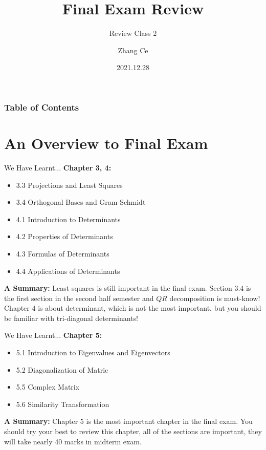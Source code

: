\documentclass{beamer}
\title[Linear Algebra] %
{Final Exam Review}
\subtitle{Review Class 2}
\author[11910803@mail.sustech.edu.cn] %
{
    Zhang Ce
}
\institute[] %
{
    Department of Electrical and Electronic Engineering\\
    Southern University of Science and Technology
}
\date[2021.12.28] %
{2021.12.28}
\begin{document}
\frame{\titlepage}


\begin{frame}
\frametitle{Table of Contents}
\tableofcontents
\end{frame}
\section{An Overview to Final Exam}
\begin{frame}{We Have Learnt...}
\textbf{Chapter 3, 4:}
\begin{itemize}
    \item 3.3 Projections and Least Squares
    \item 3.4 Orthogonal Bases and Gram-Schmidt
    \item 4.1 Introduction to Determinants
    \item 4.2 Properties of Determinants
    \item 4.3 Formulas of Determinants
    \item 4.4 Applications of Determinants
\end{itemize}

\vspace{5pt}
\textbf{A Summary:} Least squares is still important in the final exam. Section 3.4 is the first section in the second half semester and $QR$ decomposition is must-know! Chapter 4 is about determinant, which is not the most important, but you should be familiar with tri-diagonal determinants!
\end{frame}

\begin{frame}{We Have Learnt...}
\textbf{Chapter 5:}
\begin{itemize}
    \item 5.1 Introduction to Eigenvalues and Eigenvectors
    \item 5.2 Diagonalization of Matric
    \item 5.5 Complex Matrix
    \item 5.6 Similarity Transformation
\end{itemize}

\vspace{5pt}
\textbf{A Summary:} Chapter 5 is the most important chapter in the final exam. You should try your best to review this chapter, all of the sections are important, they will take nearly 40 marks in midterm exam.
\end{frame}
\end{document}
